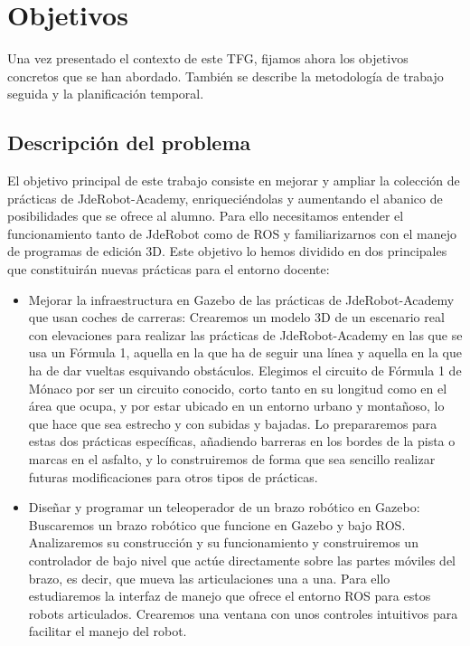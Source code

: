 \chapter{Objetivos}
\label{ch:Objetivos}

Una vez presentado el contexto de este TFG, fijamos ahora los objetivos concretos que se han abordado. También se describe la metodología de trabajo seguida y la planificación temporal.

\section{Descripción del problema}
\label{sec:obj_descripcionproblema}

El objetivo principal de este trabajo consiste en mejorar y ampliar la colección de prácticas de JdeRobot-Academy, enriqueciéndolas y aumentando el abanico de posibilidades que se ofrece al alumno. Para ello necesitamos entender el funcionamiento tanto de JdeRobot como de ROS y familiarizarnos con el manejo de programas de edición 3D. Este objetivo lo hemos dividido en dos principales que constituirán nuevas prácticas para el entorno docente:
\begin{itemize}
	\item Mejorar la infraestructura en Gazebo de las prácticas de JdeRobot-Academy que usan coches de carreras: Crearemos un modelo 3D de un escenario real con elevaciones para realizar las prácticas de JdeRobot-Academy en las que se usa un Fórmula 1, aquella en la que ha de seguir una línea y aquella en la que ha de dar vueltas esquivando obstáculos. Elegimos el circuito de Fórmula 1 de Mónaco por ser un circuito conocido, corto tanto en su longitud como en el área que ocupa, y por estar ubicado en un entorno urbano y montañoso, lo que hace que sea estrecho y con subidas y bajadas. Lo prepararemos para estas dos prácticas específicas, añadiendo barreras en los bordes de la pista o marcas en el asfalto, y lo construiremos de forma que sea sencillo realizar futuras modificaciones para otros tipos de prácticas.
	
	\item Diseñar y programar un teleoperador de un brazo robótico en Gazebo: Buscaremos un brazo robótico que funcione en Gazebo y bajo ROS. Analizaremos su construcción y su funcionamiento y construiremos un controlador de bajo nivel que actúe directamente sobre las partes móviles del brazo, es decir, que mueva las articulaciones una a una. Para ello estudiaremos la interfaz de manejo que ofrece el entorno ROS para estos robots articulados. Crearemos una ventana con unos controles intuitivos para facilitar el manejo del robot.
\end{itemize}

